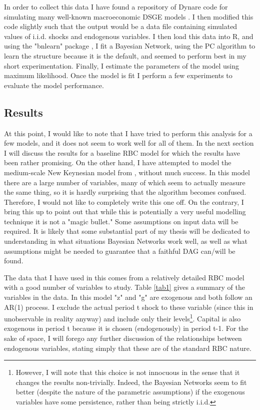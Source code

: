 \documentclass{article}
\begin{document}
In order to collect this data I have found a repository of Dynare code for simulating many well-known macroeconomic DSGE models \cite{pfeifer2020}. I then modified this code slightly such that the output would be a data file containing simulated values of i.i.d. shocks and endogenous variables. I then load this data into R, and using the "bnlearn" package \cite{scutari2020}, I fit a Bayesian Network, using the PC algorithm to learn the structure because it is the default, and seemed to perform best in my short experimentation. Finally, I estimate the parameters of the model using maximum likelihood. Once the model is fit I perform a few experiments to evaluate the model performance.

\subsection{Results}

At this point, I would like to note that I have tried to perform this analysis for a few models, and it does not seem to work well for all of them. In the next section I will discuss the results for a baseline RBC model for which the results have been rather promising. On the other hand, I have attempted to model the medium-scale New Keynesian model from \cite{smets2007shocks}, without much success. In this model there are a large number of variables, many of which seem to actually measure the same thing, so it is hardly surprising that the algorithm becomes confused. Therefore, I would not like to completely write this one off. On the contrary, I bring this up to point out that while this is potentially a very useful modelling technique it is not a "magic bullet." Some assumptions on input data will be required. It is likely that some substantial part of my thesis will be dedicated to understanding in what situations Bayesian Networks work well, as well as what assumptions might be needed to guarantee that a faithful DAG can/will be found.

The data that I have used in this comes from a relatively detailed RBC model with a good number of variables to study. Table \ref{tab1} gives a summary of the variables in the data. In this model "z" and "g" are exogenous and both follow an AR(1) process. I exclude the actual period t shock to these variable (since this in unobservable in reality anyway) and include only their levels\footnote{However, I will note that this choice is not innocuous in the sense that it changes the results non-trivially. Indeed, the Bayesian Networks seem to fit better (despite the nature of the parametric assumptions) if the exogenous variables have some persistence, rather than being strictly i.i.d.}. Capital is also exogenous in period t because it is chosen (endogenously) in period t-1. For the sake of space, I will forego any further discussion of the relationships between endogenous variables, stating simply that these are of the standard RBC nature.
\end{document}
